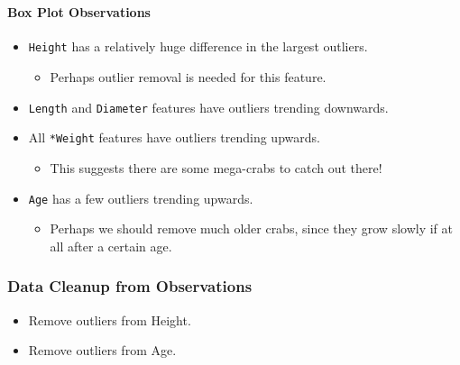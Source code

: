 \documentclass[11pt]{article}
\providecommand{\tightlist}{%
      \setlength{\itemsep}{0pt}\setlength{\parskip}{0pt}}
\begin{document}
    \begin{center}
    \end{center}
    { \hspace*{\fill} \\}
    
    \paragraph{Box Plot Observations}\label{box-plot-observations}

\begin{itemize}
\tightlist
\item
  \texttt{Height} has a relatively huge difference in the largest
  outliers.

  \begin{itemize}
  \tightlist
  \item
    Perhaps outlier removal is needed for this feature.
  \end{itemize}
\item
  \texttt{Length} and \texttt{Diameter} features have outliers trending
  downwards.
\item
  All \texttt{*Weight} features have outliers trending upwards.

  \begin{itemize}
  \tightlist
  \item
    This suggests there are some mega-crabs to catch out there!
  \end{itemize}
\item
  \texttt{Age} has a few outliers trending upwards.

  \begin{itemize}
  \tightlist
  \item
    Perhaps we should remove much older crabs, since they grow slowly if
    at all after a certain age.
  \end{itemize}
\end{itemize}

\subsubsection{Data Cleanup from
Observations}\label{data-cleanup-from-observations}

\begin{itemize}
\tightlist
\item
  Remove outliers from Height.
\item
  Remove outliers from Age.
\end{itemize}
\end{document}
